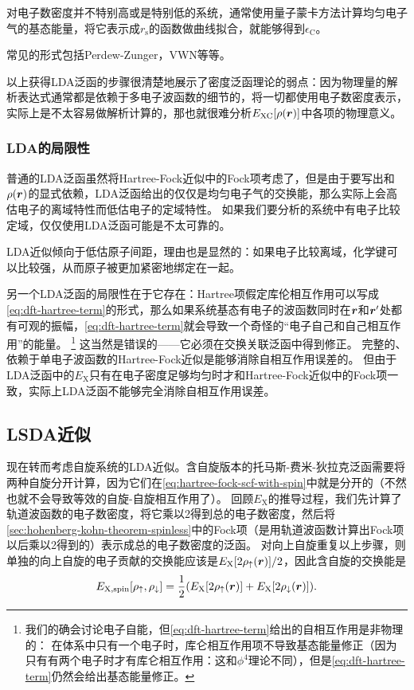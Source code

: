 对电子数密度并不特别高或是特别低的系统，通常使用量子蒙卡方法计算均匀电子气的基态能量，将它表示成$r_\text{s}$的函数做曲线拟合，就能够得到$\epsilon_\text{C}$。

常见的形式包括Perdew-Zunger，VWN等等。

以上获得LDA泛函的步骤很清楚地展示了密度泛函理论的弱点：因为物理量的解析表达式通常都是依赖于多电子波函数的细节的，将一切都使用电子数密度表示，实际上是不太容易做解析计算的，那也就很难分析$E_\text{XC}[\rho(\vb*{r})]$中各项的物理意义。

\subsubsection{LDA的局限性}

普通的LDA泛函虽然将Hartree-Fock近似中的Fock项考虑了，但是由于要写出和$\rho(\vb*{r})$的显式依赖，LDA泛函给出的仅仅是均匀电子气的交换能，那么实际上会高估电子的离域特性而低估电子的定域特性。
如果我们要分析的系统中有电子比较定域，仅仅使用LDA泛函可能是不太可靠的。

LDA近似倾向于低估原子间距，理由也是显然的：如果电子比较离域，化学键可以比较强，从而原子被更加紧密地绑定在一起。

另一个LDA泛函的局限性在于它存在：Hartree项假定库伦相互作用可以写成\eqref{eq:dft-hartree-term}的形式，那么如果系统基态有电子的波函数同时在$\vb*{r}$和$\vb*{r}'$处都有可观的振幅，\eqref{eq:dft-hartree-term}就会导致一个奇怪的“电子自己和自己相互作用”的能量。%
\footnote{
    我们的确会讨论电子自能，但\eqref{eq:dft-hartree-term}给出的自相互作用是非物理的：
    在体系中只有一个电子时，库仑相互作用项不导致基态能量修正（因为只有有两个电子时才有库仑相互作用：这和$\phi^4$理论不同），但是\eqref{eq:dft-hartree-term}仍然会给出基态能量修正。
}%
这当然是错误的——它必须在交换关联泛函中得到修正。
完整的、依赖于单电子波函数的Hartree-Fock近似是能够消除自相互作用误差的。
但由于LDA泛函中的$E_\text{X}$只有在电子密度足够均匀时才和Hartree-Fock近似中的Fock项一致，实际上LDA泛函不能够完全消除自相互作用误差。

\subsection{LSDA近似}

现在转而考虑自旋系统的LDA近似。含自旋版本的托马斯-费米-狄拉克泛函需要将两种自旋分开计算，因为它们在\eqref{eq:hartree-fock-scf-with-spin}中就是分开的（不然也就不会导致等效的自旋-自旋相互作用了）。
回顾$E_\text{X}$的推导过程，我们先计算了轨道波函数的电子数密度，将它乘以2得到总的电子数密度，然后将\eqref{sec:hohenberg-kohn-theorem-spinless}中的Fock项（是用轨道波函数计算出Fock项以后乘以2得到的）表示成总的电子数密度的泛函。
对向上自旋重复以上步骤，则单独的向上自旋的电子贡献的交换能应该是$E_\text{X}[2 \rho_\uparrow(\vb*{r})] / 2$，因此含自旋的交换能是
\begin{equation}
    E_\text{X,spin}[\rho_\uparrow, \rho_\downarrow] = \frac{1}{2} (E_\text{X}[2 \rho_\uparrow(\vb*{r})] + E_\text{X}[2 \rho_\downarrow(\vb*{r})]).
\end{equation}

